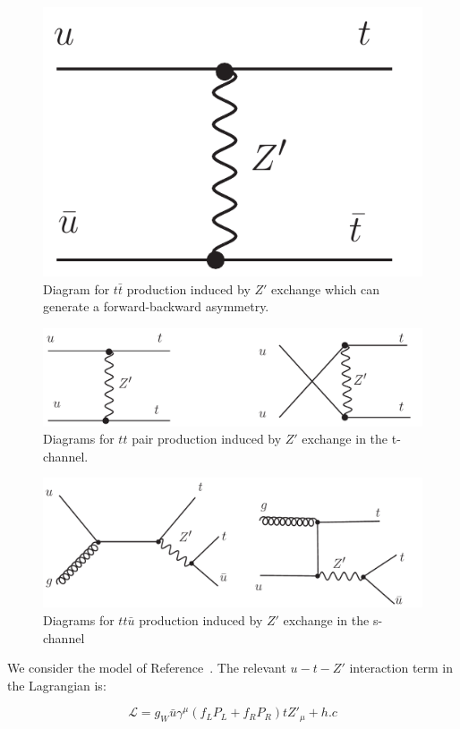 \begin{figure}[htb]
\begin{center}
\includegraphics[width=0.35\linewidth, height=0.25\linewidth]{figs/ttbar_Z.pdf}
\caption{ Diagram for $t\bar{t}$ production induced by $Z'$ exchange which
can generate a forward-backward asymmetry. \label{fig:ttbaras}}
\end{center}
\end{figure}

\begin{figure}[htb]
\begin{center}
\includegraphics[width=0.7\linewidth, height=0.2\linewidth]{figs/sstop1.pdf}
\caption{ Diagrams for $tt$ pair production induced by $Z'$ exchange in the t-channel. 
\label{fig:tchannel}}
\end{center}
\end{figure}

\begin{figure}[htb]
\begin{center}
\includegraphics[width=0.7\linewidth, height=0.25\linewidth]{figs/sstop2.pdf}
\caption{ Diagrams for $tt\bar{u}$ production induced by $Z'$ exchange in the s-channel 
\label{fig:schannel}}
\end{center}
\end{figure}


We consider the model of Reference~\cite{fcnczprime}.  
The relevant $u-t-Z'$ interaction term in the Lagrangian is:

\begin{equation}
\label{eqn:L_berger}
  \mathcal{L} = g_W \bar{u} \gamma^\mu (f_L P_L + f_R P_R)tZ'_\mu + h.c
\end{equation}

